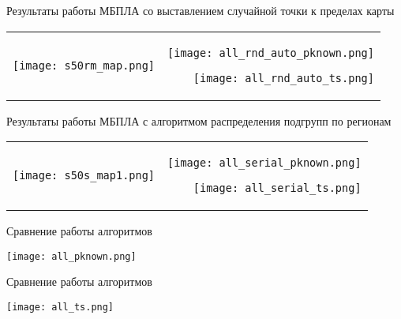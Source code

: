 \begin{tslide}{Результаты работы МБПЛА со выставлением случайной точки к пределах карты}

    \vfill
    \centering
    \begin{tabular}{l r}
    \begin{minipage}[h]{.5\linewidth}
    \centering
    \texttt{[image: s50rm\_map.png]}
    \end{minipage}
    &
    \begin{minipage}[h]{.5\linewidth}
    \centering
    \texttt{[image: all\_rnd\_auto\_pknown.png]}

    \texttt{[image: all\_rnd\_auto\_ts.png]}
    \end{minipage}
    \end{tabular}
    \vfill

\end{tslide}

\begin{tslide}{Результаты работы МБПЛА с алгоритмом распределения подгрупп по регионам}

    \vfill
    \centering
    \begin{tabular}{l r}
    \begin{minipage}[h]{.5\linewidth}
    \centering
    \texttt{[image: s50s\_map1.png]}
    \end{minipage}
    &
    \begin{minipage}[h]{.5\linewidth}
    \centering
    \texttt{[image: all\_serial\_pknown.png]}

    \texttt{[image: all\_serial\_ts.png]}
    \end{minipage}
    \end{tabular}
    \vfill

\end{tslide}

\begin{tslide}{Сравнение работы алгоритмов}

    \centering
    \texttt{[image: all\_pknown.png]}

\end{tslide}

\begin{tslide}{Сравнение работы алгоритмов}

    \centering
    \texttt{[image: all\_ts.png]}

\end{tslide}

